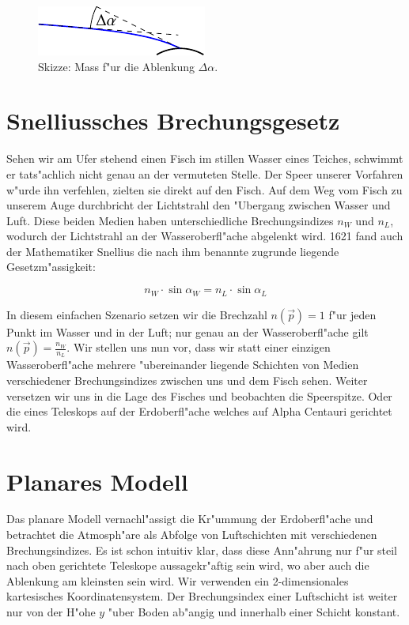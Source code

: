 \begin{refsection}
\begin{figure}
  \centering
  \includegraphics{licht/standalone/fig_delta_alpha.pdf}
  \caption{Skizze: Mass f"ur die Ablenkung $\Delta \alpha$. \label{fig:skizze_mass}}
\end{figure}

\section{Snelliussches Brechungsgesetz} 

Sehen wir am Ufer stehend einen Fisch im stillen Wasser eines Teiches, schwimmt er tats"achlich nicht genau an der vermuteten Stelle. 
Der Speer unserer Vorfahren w"urde ihn verfehlen, zielten sie direkt auf den Fisch.
Auf dem Weg vom Fisch zu unserem Auge durchbricht der Lichtstrahl den "Ubergang zwischen Wasser und Luft. 
Diese beiden Medien haben unterschiedliche Brechungsindizes $n_W$ und $n_L$, wodurch der Lichtstrahl an der Wasseroberfl"ache abgelenkt wird.
1621 fand auch der Mathematiker Snellius die nach ihm benannte zugrunde liegende Gesetzm"assigkeit:

\begin{equation} \label{eq:snellius}
n_W \cdot \sin \alpha_W = n_L \cdot \sin \alpha_L 
\end{equation}

In diesem einfachen Szenario setzen wir die Brechzahl $n(\vec{p}) = 1$ f"ur jeden Punkt im Wasser und in der Luft; nur genau an der Wasseroberfl"ache gilt $n(\vec{p}) = \frac{n_W}{n_L}$.
Wir stellen uns nun vor, dass wir statt einer einzigen Wasseroberfl"ache mehrere "ubereinander liegende Schichten von Medien verschiedener Brechungsindizes zwischen uns und dem Fisch sehen.
Weiter versetzen wir uns in die Lage des Fisches und beobachten die Speerspitze. 
Oder die eines Teleskops auf der Erdoberfl"ache welches auf Alpha Centauri gerichtet wird.

\section{Planares Modell} 

Das planare Modell vernachl"assigt die Kr"ummung der Erdoberfl"ache und betrachtet die Atmosph"are als Abfolge von Luftschichten mit verschiedenen Brechungsindizes. 
Es ist schon intuitiv klar, dass diese Ann"ahrung nur f"ur steil nach oben gerichtete Teleskope aussagekr"aftig sein wird, wo aber auch die Ablenkung am kleinsten sein wird.
Wir verwenden ein 2-dimensionales kartesisches Koordinatensystem. 
Der Brechungsindex einer Luftschicht ist weiter nur von der H"ohe $y$ "uber Boden ab"angig und innerhalb einer Schicht konstant.


\end{refsection}
